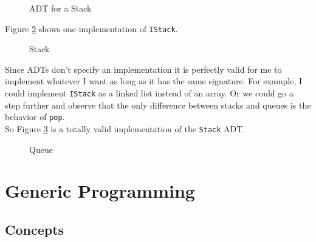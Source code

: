 \begin{figure}[H]
    
    \label{fig:istack}
    \caption{ADT for a Stack}
\end{figure}

\newpage

Figure \ref{fig:stack} shows one implementation of \texttt{IStack}.

\begin{figure}[h]
    
    \label{fig:stack}
    \caption{Stack}
\end{figure}

Since ADTs don't specify an implementation it is perfectly valid for me to implement whatever I want as long as it has the same signature.
For example, I could implement \texttt{IStack} as a linked list instead of an array.
Or we could go a step further and observe that the only difference between stacks and queues is the behavior of \texttt{pop}.\\
So Figure \ref{fig:queue} is a totally valid implementation of the \texttt{Stack} ADT.

\begin{figure}[!h]
    
    \label{fig:queue}
    \caption{Queue}
\end{figure}
\section{Generic Programming}

\subsection{Concepts}